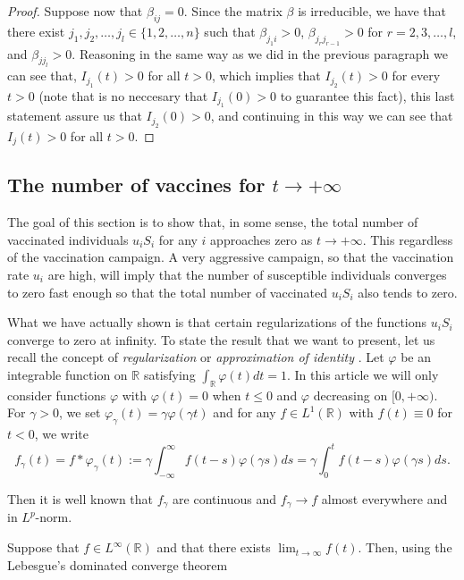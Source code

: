 \documentclass[a4paper,10pt]{article}
\theoremstyle{remark}
\begin{document}
\begin{proof}
Suppose now that $\beta_{ij}=0$. 
Since the matrix $\beta$ is irreducible, we have that there exist $j_1,j_2,\ldots,j_l \in \{1,2,\ldots,n\}$ such that $\beta_{{j_{1} i}}>0$, $\beta_{j_{r}j_{r-1}}>0$ for $r=2,3,\ldots,l$, and $\beta_{jj_{l}}>0$. Reasoning in the same way as we did in the previous paragraph we can see that, $I_{j_1}(t)>0$ for all $t>0$, which implies that $I_{j_2}(t)>0$ for every $t>0$ (note that is no neccesary that $I_{j_1}(0)>0$ to guarantee this fact), this last statement assure us that $I_{j_2}(0)>0$, and continuing in this way we can see that $I_j(t)>0$ for all $t>0$.




\end{proof}


\subsection{The number of vaccines  for  $t\to +\infty$}

The goal of this section is to show that, in some sense, the total number of vaccinated individuals $u_iS_i$ for any $i$ approaches zero as $t\to+\infty$. This regardless of the vaccination campaign. A very aggressive campaign, so that the vaccination rate $u_i$ are high, will imply that the number of susceptible individuals converges to zero fast enough so that the total number of vaccinated $u_iS_i$ also tends to zero.

What we have actually shown is that certain regularizations of the functions $u_iS_i$ converge to zero at infinity. To state the result that we want to present, let us recall the concept of \emph{regularization} or \emph{approximation of identity}  \cite{EliasM.Stein120}. Let $\varphi$ be an  integrable function on $\mathbb{R}$ satisfying $\int_\mathbb{R}\varphi(t)dt=1$.  In this article we will only consider functions $\varphi$  with $\varphi(t)=0$ when $t\leq 0$ and $\varphi$ decreasing on $[0,+\infty)$. For $\gamma>0$, we set $\varphi_\gamma(t)=\gamma\varphi(\gamma t)$ and for any $f\in L^1(\mathbb{R})$ with $f(t)\equiv 0$ for $t<0$, we write
\[
 f_{\gamma}(t)=f\ast \varphi_\gamma (t):= \gamma\int_{-\infty}^\infty f(t-s)\varphi(\gamma s)ds= \gamma\int_0^t f(t-s)\varphi(\gamma s)ds. 
\]

Then it is well known \cite{EliasM.Stein120} that $f_\gamma$ are continuous and  $f_\gamma\to f$  almost everywhere and in $L^p$-norm.  

 Suppose that $f\in L^\infty(\mathbb{R})$ and that there exists  $\lim_{t\to\infty}f(t)$.   Then, using the Lebesgue's dominated converge theorem 
\end{document}
